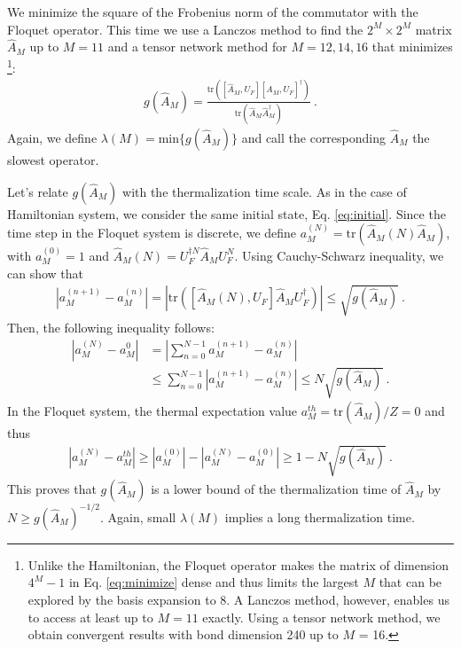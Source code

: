 \documentclass[twocolumn,superscriptaddress, prl,showpacs]{revtex4-1}
\begin{document}
We minimize the square of the Frobenius norm of the commutator with the Floquet operator.
This time we use a Lanczos method to find the $2^M \times 2^M$ matrix $\hat{A}_M$ up to $M = 11$ and a tensor network method for $M = 12, 14, 16$
that minimizes \footnote{Unlike the Hamiltonian, the Floquet operator makes the matrix of dimension $4^M-1$ in Eq. \eqref{eq:minimize} dense and thus
limits the largest $M$ that can be explored by the basis expansion to 8. A Lanczos method, however, enables us to access at least up to $M = 11$ exactly.
Using a tensor network method, we obtain convergent results with bond dimension 240 up to $M$ = 16.}:
\begin{align}\label{eq:floquet_minimize}
g(\hat{A}_M) = \frac{\mathrm{tr}([\hat{A}_M,U_F][\hat{A}_M,U_F]^\dag)}{\mathrm{tr}(\hat{A}_M\hat{A}_M^\dag)} ~.
\end{align}
Again, we define $\lambda(M) = \mathrm{min}\{g(\hat{A}_M)\}$ and
call the corresponding $\hat{A}_M$ the slowest operator.

Let's relate $g(\hat{A}_M) $ with the thermalization time scale.
As in the case of Hamiltonian system, we consider the same initial state, Eq. \eqref{eq:initial}.
Since the time step in the Floquet system is discrete, we define $a_M^{(N)} = \mathrm{tr}(\hat{A}_M(N)\hat{A}_M )$, with
$a_M^{(0)} = 1$ and $\hat{A}_M(N) = U_F^{\dag N}\hat{A}_M U_F^N$. Using Cauchy-Schwarz inequality, we can show that
\begin{align}
|a_M^{(n+1)} - a_M^{(n)}| = |\mathrm{tr}([\hat{A}_M(N),U_F]\hat{A}_M U_F^{\dag})| \leq \sqrt{g(\hat{A}_M) } ~.
\end{align}
Then, the following inequality follows:
\begin{align}
|a_M^{(N)} - a_M^{0}| &= \left|\sum_{n=0}^{N-1}a_M^{(n+1)} - a_M^{(n)}\right| \nonumber\\
&\leq \sum_{n = 0}^{N-1}|a_M^{(n+1)} - a_M^{(n)}| \leq N \sqrt{g(\hat{A}_M) } ~.
\end{align}
In the Floquet system, the thermal expectation value $a^{th}_M = \mathrm{tr}(\hat{A}_M)/Z = 0$ and thus
\begin{align}
|a_M^{(N)} - a_M^{th}| \geq |a_M^{(0)}| - |a_M^{(N)} - a_M^{(0)}| \geq 1 - N \sqrt{g(\hat{A}_M) } ~.
\label{eq:floquet_timescale}
\end{align}
This proves that $g(\hat{A}_M)$ is a lower bound of the thermalization time of $\hat{A}_M$ by
$N \geq g(\hat{A}_M) ^{-1/2}$. Again, small $\lambda(M)$ implies a long thermalization time.
\end{document}
